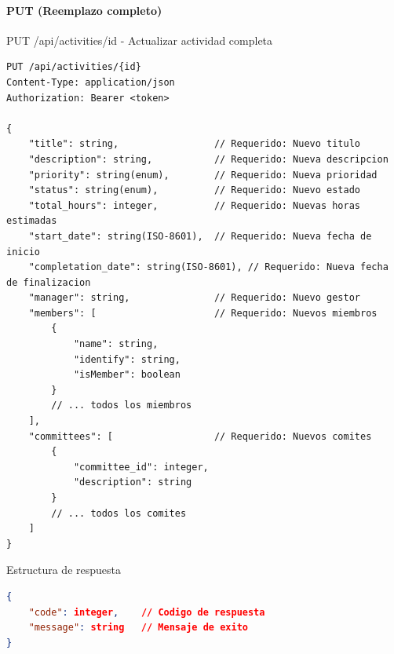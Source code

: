 \documentclass[11pt,a4paper]{article}
\begin{document}
\paragraph{PUT (Reemplazo completo)}
\begin{center}
	\begin{minipage}{\textwidth}
		\begin{codebox}{PUT /api/activities/{id} - Actualizar actividad completa}
			\begin{lstlisting}[language=HTTP]
PUT /api/activities/{id}
Content-Type: application/json
Authorization: Bearer <token>

{
    "title": string,                 // Requerido: Nuevo titulo
    "description": string,           // Requerido: Nueva descripcion
    "priority": string(enum),        // Requerido: Nueva prioridad
    "status": string(enum),          // Requerido: Nuevo estado
    "total_hours": integer,          // Requerido: Nuevas horas estimadas
    "start_date": string(ISO-8601),  // Requerido: Nueva fecha de inicio
    "completation_date": string(ISO-8601), // Requerido: Nueva fecha de finalizacion
    "manager": string,               // Requerido: Nuevo gestor
    "members": [                     // Requerido: Nuevos miembros
        {
            "name": string,
            "identify": string,
            "isMember": boolean
        }
        // ... todos los miembros
    ],
    "committees": [                  // Requerido: Nuevos comites
        {
            "committee_id": integer,
            "description": string
        }
        // ... todos los comites
    ]
}
\end{lstlisting}
		\end{codebox}
	\end{minipage}
\end{center}

\begin{center}
	\begin{minipage}{\textwidth}
		\begin{codebox}{Estructura de respuesta}
			\begin{lstlisting}[language=json]
{
    "code": integer,    // Codigo de respuesta
    "message": string   // Mensaje de exito
}
\end{lstlisting}
		\end{codebox}
	\end{minipage}
\end{center}
\end{document}
